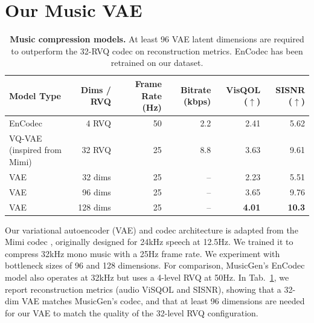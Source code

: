 \section{Our Music VAE}
\label{sec:music_vae}
\begin{table}[h]
\caption{\textbf{Music compression models.} At least 96 VAE latent dimensions are required to outperform the 32-RVQ codec on reconstruction metrics. EnCodec has been retrained on our dataset.}
\centering
\scriptsize %
\setlength{\tabcolsep}{4pt} %
\renewcommand{\arraystretch}{0.95} %
\begin{tiny}
\begin{sc}

\begin{tabular}{lrrrrr}
\toprule
\textbf{Model Type} & \textbf{Dims / RVQ} & \textbf{Frame Rate (Hz)} & \textbf{Bitrate (kbps)} & \textbf{VisQOL} ($\uparrow$) & \textbf{SISNR} ($\uparrow$) \\
\midrule
EnCodec \cite{musicgen}
 & 4 RVQ & 50 & 2.2 & 2.41 & 5.62 \\
VQ-VAE (inspired from Mimi) & 32 RVQ & 25 & 8.8 & 3.63 & 9.61 \\
VAE & 32 dims  & 25 & --  & 2.23 & 5.51 \\
VAE & 96 dims  & 25 & --  & 3.65 & 9.76 \\
VAE & 128 dims & 25 & --  & \textbf{4.01} & \textbf{10.3} \\
\bottomrule
\end{tabular}
\end{sc}
\end{tiny}
\label{tab:visqol}
\end{table}

Our variational autoencoder (VAE) and codec architecture is adapted from the Mimi codec \citep{moshi}, originally designed for 24kHz speech at 12.5Hz. We trained it to compress 32kHz mono music with a 25Hz frame rate. We experiment with bottleneck sizes of 96 and 128 dimensions. For comparison, MusicGen's EnCodec model \citep{musicgen} also operates at 32kHz but uses a 4-level RVQ at 50Hz. In Tab.~\ref{tab:visqol}, we report reconstruction metrics (audio ViSQOL \cite{visqol} and SISNR), showing that a 32-dim VAE matches MusicGen's codec, and that at least 96 dimensions are needed for our VAE to match the quality of the 32-level RVQ configuration.

